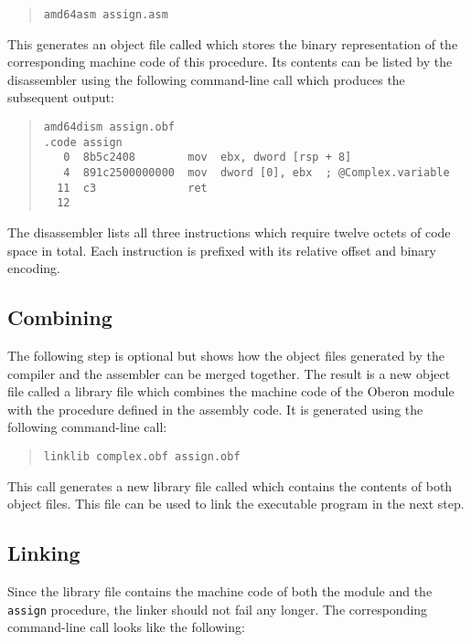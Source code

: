 \begin{quote}\begin{verbatim}
amd64asm assign.asm
\end{verbatim}\end{quote}

This generates an object file called  which stores the binary representation of the corresponding machine code of this procedure.
Its contents can be listed by the disassembler using the following command-line call which produces the subsequent output:

\begin{quote}\begin{verbatim}
amd64dism assign.obf
.code assign
   0  8b5c2408        mov  ebx, dword [rsp + 8]
   4  891c2500000000  mov  dword [0], ebx  ; @Complex.variable
  11  c3              ret
  12
\end{verbatim}\end{quote}

The disassembler lists all three instructions which require twelve octets of code space in total.
Each instruction is prefixed with its relative offset and binary encoding.

\subsection{Combining}

The following step is optional but shows how the object files generated by the compiler and the assembler can be merged together.
The result is a new object file called a library file which combines the machine code of the Oberon module with the procedure defined in the assembly code.
It is generated using the following command-line call:

\begin{quote}\begin{verbatim}
linklib complex.obf assign.obf
\end{verbatim}\end{quote}

This call generates a new library file called  which contains the contents of both object files.
This file can be used to link the executable program in the next step.

\subsection{Linking}

Since the library file contains the machine code of both the module and the \texttt{assign} procedure, the linker should not fail any longer.
The corresponding command-line call looks like the following:

